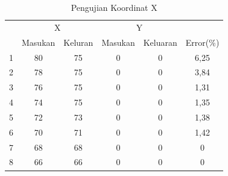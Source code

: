  \begin{table}[]
 	\caption{Pengujian Koordinat X}
 	\small
 	\label{tbl.koordinatx}
 	\centering
 	
 	\begin{tabular}{|c|c|c|c|c|c|}
 		\hline
 		\rowcolor[HTML]{9B9B9B} 
 		\cellcolor[HTML]{9B9B9B}                     & \multicolumn{2}{c|}{\cellcolor[HTML]{9B9B9B}X} & \multicolumn{2}{c|}{\cellcolor[HTML]{9B9B9B}Y} & \cellcolor[HTML]{9B9B9B}                           \\ \cline{2-5}
 		\rowcolor[HTML]{9B9B9B} 
 		\multirow{-2}{*}{\cellcolor[HTML]{9B9B9B}No} & Masukan                & Keluran               & Masukan               & Keluaran               & \multirow{-2}{*}{\cellcolor[HTML]{9B9B9B}Error(\%)} \\ \hline
 			1                                            & 80                     & 75                    & 0                     & 0                      & 6,25                                               \\ \hline
 			2                                            & 78                     & 75                    & 0                     & 0                      & 3,84                                       \\ \hline
 			3                                            & 76                     & 75                    & 0                     & 0                      & 1,31                                        \\ \hline
 			4                                            & 74                     & 75                    & 0                     & 0                      & 1,35                                       \\ \hline
 			5                                            & 72                     & 73                    & 0                     & 0                      & 1,38                                        \\ \hline
 			6                                            & 70                     & 71                    & 0                     & 0                      & 1,42                                    \\ \hline
 			7                                            & 68                     & 68                    & 0                     & 0                      & 0                                                  \\ \hline
 			8                                            & 66                     & 66                    & 0                     & 0                      & 0                                                  \\ \hline

\end{tabular}
\end{table}
